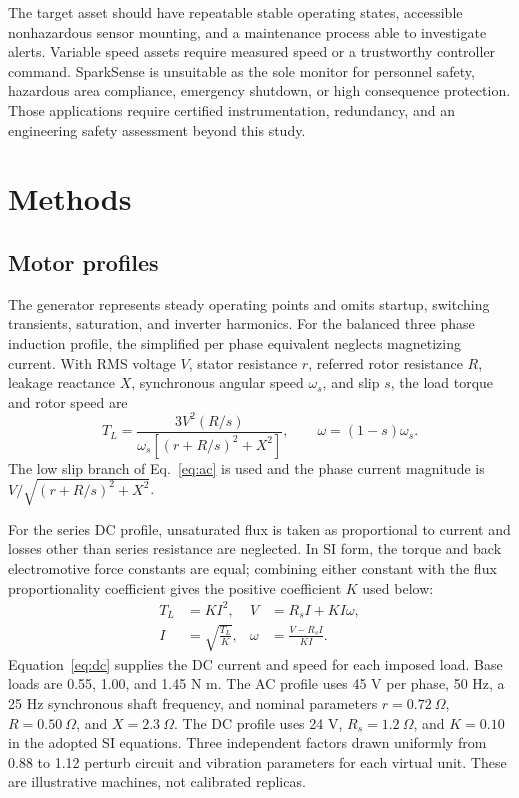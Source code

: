 \documentclass[10pt,twocolumn]{article}
\begin{document}
The target asset should have repeatable stable operating states, accessible nonhazardous sensor mounting, and a maintenance process able to investigate alerts. Variable speed assets require measured speed or a trustworthy controller command. SparkSense is unsuitable as the sole monitor for personnel safety, hazardous area compliance, emergency shutdown, or high consequence protection. Those applications require certified instrumentation, redundancy, and an engineering safety assessment beyond this study.

\section{Methods}
\label{sec:methods}
\subsection{Motor profiles}
The generator represents steady operating points and omits startup, switching transients, saturation, and inverter harmonics. For the balanced three phase induction profile, the simplified per phase equivalent neglects magnetizing current. With RMS voltage $V$, stator resistance $r$, referred rotor resistance $R$, leakage reactance $X$, synchronous angular speed $\omega_s$, and slip $s$, the load torque and rotor speed are
\begin{equation}
T_L=\frac{3V^2(R/s)}{\omega_s\left[(r+R/s)^2+X^2\right]},\qquad
\omega=(1-s)\omega_s .
\label{eq:ac}
\end{equation}
The low slip branch of Eq.~\eqref{eq:ac} is used and the phase current magnitude is $V/\sqrt{(r+R/s)^2+X^2}$.

For the series DC profile, unsaturated flux is taken as proportional to current and losses other than series resistance are neglected. In SI form, the torque and back electromotive force constants are equal; combining either constant with the flux proportionality coefficient gives the positive coefficient $K$ used below:
\begin{equation}
\begin{aligned}
T_L &= K I^2, & V &= R_s I + K I\omega,\\
I &= \sqrt{\frac{T_L}{K}}, &
\omega &= \frac{V-R_s I}{K I}.
\end{aligned}
\label{eq:dc}
\end{equation}
Equation~\eqref{eq:dc} supplies the DC current and speed for each imposed load. Base loads are 0.55, 1.00, and 1.45 N m. The AC profile uses 45 V per phase, 50 Hz, a 25 Hz synchronous shaft frequency, and nominal parameters $r=0.72~\Omega$, $R=0.50~\Omega$, and $X=2.3~\Omega$. The DC profile uses 24 V, $R_s=1.2~\Omega$, and $K=0.10$ in the adopted SI equations. Three independent factors drawn uniformly from 0.88 to 1.12 perturb circuit and vibration parameters for each virtual unit. These are illustrative machines, not calibrated replicas.
\end{document}

